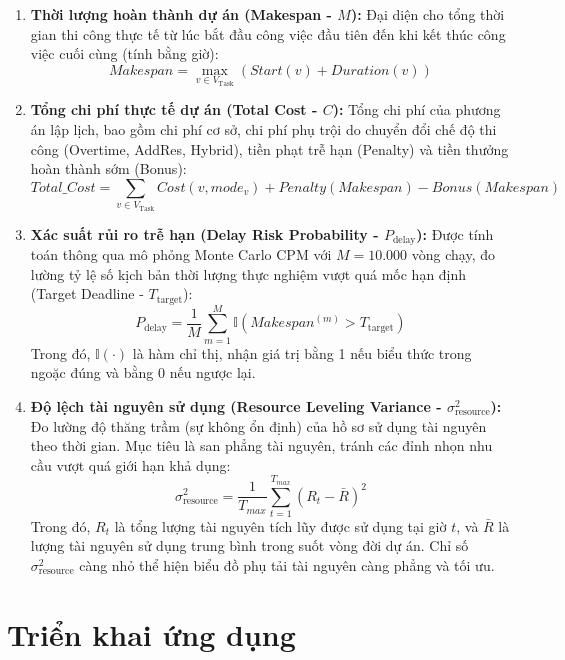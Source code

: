 \begin{enumerate}
    \item \textbf{Thời lượng hoàn thành dự án (Makespan - $M$):}
    Đại diện cho tổng thời gian thi công thực tế từ lúc bắt đầu công việc đầu tiên đến khi kết thúc công việc cuối cùng (tính bằng giờ):
    $$Makespan = \max_{v \in V_{\text{Task}}} \left( Start(v) + Duration(v) \right)$$
    
    \item \textbf{Tổng chi phí thực tế dự án (Total Cost - $C$):}
    Tổng chi phí của phương án lập lịch, bao gồm chi phí cơ sở, chi phí phụ trội do chuyển đổi chế độ thi công (Overtime, AddRes, Hybrid), tiền phạt trễ hạn (Penalty) và tiền thưởng hoàn thành sớm (Bonus):
    $$Total\_Cost = \sum_{v \in V_{\text{Task}}} Cost(v, mode_v) + Penalty(Makespan) - Bonus(Makespan)$$
    
    \item \textbf{Xác suất rủi ro trễ hạn (Delay Risk Probability - $P_{\text{delay}}$):}
    Được tính toán thông qua mô phỏng Monte Carlo CPM với $M = 10.000$ vòng chạy, đo lường tỷ lệ số kịch bản thời lượng thực nghiệm vượt quá mốc hạn định (Target Deadline - $T_{\text{target}}$):
    $$P_{\text{delay}} = \frac{1}{M} \sum_{m=1}^M \mathbb{I}\left( Makespan^{(m)} > T_{\text{target}} \right)$$
    Trong đó, $\mathbb{I}(\cdot)$ là hàm chỉ thị, nhận giá trị bằng 1 nếu biểu thức trong ngoặc đúng và bằng 0 nếu ngược lại.
    
    \item \textbf{Độ lệch tài nguyên sử dụng (Resource Leveling Variance - $\sigma^2_{\text{resource}}$):}
    Đo lường độ thăng trầm (sự không ổn định) của hồ sơ sử dụng tài nguyên theo thời gian. Mục tiêu là san phẳng tài nguyên, tránh các đỉnh nhọn nhu cầu vượt quá giới hạn khả dụng:
    $$\sigma^2_{\text{resource}} = \frac{1}{T_{max}} \sum_{t=1}^{T_{max}} \left( R_t - \bar{R} \right)^2$$
    Trong đó, $R_t$ là tổng lượng tài nguyên tích lũy được sử dụng tại giờ $t$, và $\bar{R}$ là lượng tài nguyên sử dụng trung bình trong suốt vòng đời dự án. Chỉ số $\sigma^2_{\text{resource}}$ càng nhỏ thể hiện biểu đồ phụ tải tài nguyên càng phẳng và tối ưu.
\end{enumerate}

\section{Triển khai ứng dụng}
\label{sec:2.11_deployment}

